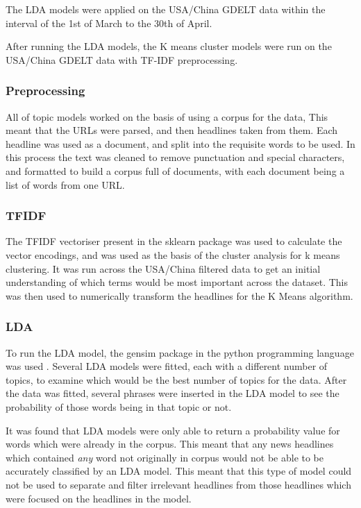 The LDA models were applied on the USA/China GDELT data within the interval of the 1st of March to the 30th of April. 

After running the LDA models, the K means cluster models were run on the USA/China GDELT data with TF-IDF preprocessing.

\subsubsection{Preprocessing}
All of topic models worked on the basis of using a corpus for the data, This meant that the URLs were parsed, and then headlines taken from them. Each headline was used as a document, and split into the requisite words to be used. In this process the text was cleaned to remove punctuation and special characters, and formatted to build a corpus full of documents, with each document being a list of words from one URL. 
\subsubsection{TFIDF}
The TFIDF vectoriser present in the sklearn package was used to calculate the vector encodings, and was used as the basis of the cluster analysis for k means clustering. It was run across the USA/China filtered data to get an initial understanding of which terms would be most important across the dataset. This was then used to numerically transform the headlines for the K Means algorithm. 

\subsubsection{LDA}
To run the LDA model, the gensim package in the python programming language was used \cite{rehurek_lrec}. Several LDA models were fitted, each with a different number of topics, to examine which would be the best number of topics for the data. After the data was fitted, several phrases were inserted in the LDA model to see the probability of those words being in that topic or not. 

It was found that LDA models were only able to return a probability value for words which were already in the corpus.  This meant that any news headlines which contained \textit{any} word not originally in corpus would not be able to be accurately classified by an LDA model. This meant that this type of model could not be used to separate and filter irrelevant headlines from those headlines which were focused on the headlines in the model. 

